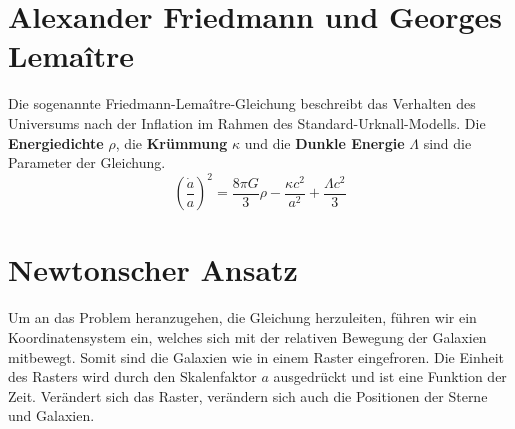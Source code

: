 \begin{refsection}
\section{Alexander Friedmann und Georges Lema\^{i}tre}
Die sogenannte Friedmann-Lema\^{i}tre-Gleichung beschreibt das Verhalten des Universums nach der Inflation im Rahmen des Standard-Urknall-Modells. Die \textbf{Energiedichte} $\rho$, die \textbf{Krümmung} $\kappa$ und die \textbf{Dunkle Energie} $\Lambda$ sind die Parameter der Gleichung.
\begin{equation}
\left(\frac{\dot{a}}{a}\right) ^2 = \frac{8 \pi G}{3} \rho - \frac{\kappa c^2}{a^2} + \frac{\Lambda c^2}{3}
\end{equation}
\section{Newtonscher Ansatz}
Um an das Problem heranzugehen, die Gleichung herzuleiten, führen wir ein Koordinatensystem ein, welches sich mit der relativen Bewegung der Galaxien mitbewegt. Somit sind die Galaxien wie in einem Raster eingefroren. Die Einheit des Rasters wird durch den Skalenfaktor $a$ ausgedrückt und ist eine Funktion der Zeit. Verändert sich das Raster, verändern sich auch die Positionen der Sterne und Galaxien.


\end{refsection}
